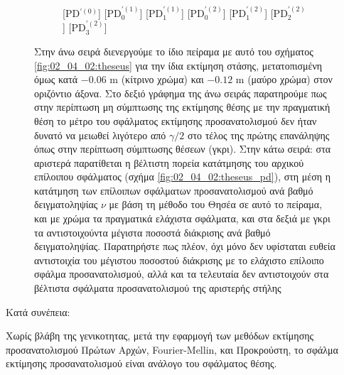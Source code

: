 \begin{figure}[!h]
\begin{subfigure}{0.30\linewidth}
\begin{onion}{0.7cm}
      [PD$^{\prime (0)}$]
      [PD$_0^{\prime (1)}$]
      [PD$_1^{\prime (1)}$]
      [PD$_0^{\prime (2)}$]
      [PD$_1^{\prime (2)}$]
      [PD$_2^{\prime (2)}$]
      [PD$_3^{\prime (2)}$]
    \end{onion}
  \end{subfigure}
\vspace{-1cm}
\caption{\small Στην άνω σειρά διενεργούμε το ίδιο πείραμα με αυτό του σχήματος
         \ref{fig:02_04_02:theseus} για την ίδια εκτίμηση στάσης, μετατοπισμένη
         όμως κατά $-0.06$ m (κίτρινο χρώμα) και $-0.12$ m (μαύρο χρώμα) στον
         οριζόντιο άξονα. Στο δεξιό γράφημα της άνω σειράς παρατηρούμε πως στην
         περίπτωση μη σύμπτωσης της εκτίμησης θέσης με την πραγματική θέση το
         μέτρο του σφάλματος εκτίμησης προσανατολισμού δεν ήταν δυνατό να
         μειωθεί λιγότερο από $\gamma/2$ στο τέλος της πρώτης επανάληψης όπως
         στην περίπτωση σύμπτωσης θέσεων (γκρι). Στην κάτω σειρά: στα αριστερά
         παρατίθεται η βέλτιστη πορεία κατάτμησης του αρχικού επίλοιπου
         σφάλματος (σχήμα \ref{fig:02_04_02:theseus_pd}), στη μέση η κατάτμηση
         των επίλοιπων σφάλματων προσανατολισμού ανά βαθμό δειγματοληψίας $\nu$
         με βάση τη μέθοδο του Θησέα σε αυτό το πείραμα, και με χρώμα τα
         πραγματικά ελάχιστα σφάλματα, και στα δεξιά με γκρι τα αντιστοιχούντα
         μέγιστα ποσοστά διάκρισης ανά βαθμό δειγματοληψίας.  Παρατηρήστε πως
         πλέον, όχι μόνο δεν υφίσταται ευθεία αντιστοιχία του μέγιστου ποσοστού
         διάκρισης με το ελάχιστο επίλοιπο σφάλμα προσανατολισμού, αλλά και τα
         τελευταία δεν αντιστοιχούν στα βέλτιστα σφάλματα προσανατολισμού της
         αριστερής στήλης}
\label{fig:02_04_02:theseus_false_pd}
\end{figure}

Κατά συνέπεια:

\begin{remark}
  \label{remark:02_04_02:01}
  Χωρίς βλάβη της γενικοτητας, μετά την εφαρμογή των μεθόδων εκτίμησης
  προσανατολισμού Πρώτων Αρχών, Fourier-Mellin, και Προκρούστη, το σφάλμα
  εκτίμησης προσανατολισμού είναι ανάλογο του σφάλματος θέσης.
\end{remark}


